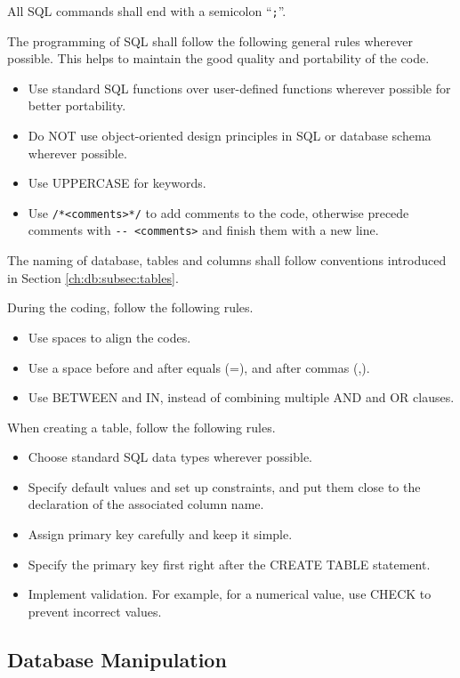 All SQL commands shall end with a semicolon ``\verb|;|''.

The programming of SQL shall follow the following general rules wherever possible. This helps to maintain the good quality and portability of the code.
\begin{itemize}
	\item Use standard SQL functions over user-defined functions wherever possible for better portability.
	\item Do NOT use object-oriented design principles in SQL or database schema wherever possible.
	\item Use UPPERCASE for keywords.
	\item Use \verb|/*<comments>*/| to add comments to the code, otherwise precede comments with \verb|-- <comments>| and finish them with a new line.
\end{itemize}

The naming of database, tables and columns shall follow conventions introduced in Section \ref{ch:db:subsec:tables}.

During the coding, follow the following rules.
\begin{itemize}
	\item Use spaces to align the codes.
	\item Use a space before and after equals (=), and after commas (,).
	\item Use BETWEEN and IN, instead of combining multiple AND and OR clauses.
\end{itemize}

When creating a table, follow the following rules.
\begin{itemize}
	\item Choose standard SQL data types wherever possible.
	\item Specify default values and set up constraints, and put them close to the declaration of the associated column name.
	\item Assign primary key carefully and keep it simple.
	\item Specify the primary key first right after the CREATE TABLE statement.
	\item Implement validation. For example, for a numerical value, use CHECK to prevent incorrect values.
\end{itemize}

\subsection{Database Manipulation}

